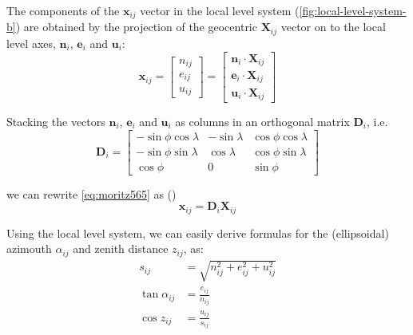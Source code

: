 The components of the $\bm{x}_{ij}$ vector in the local level system 
(\ref{fig:local-level-system-b})  are obtained by the projection of the geocentric 
$\bm{X}_{ij}$ vector on to the local level axes, $\bm{n}_i$, $\bm{e}_i$ and 
$\bm{u}_i$:
\begin{equation}
  \label{eq:moritz565}
  \bm{x}_{ij} = \begin{bmatrix} n_{ij} \\ e_{ij} \\ u_{ij} \end{bmatrix} = 
    \begin{bmatrix} 
      \bm{n}_i \cdot \bm{X}_{ij} \\
      \bm{e}_i \cdot \bm{X}_{ij} \\
      \bm{u}_i \cdot \bm{X}_{ij}
      \end{bmatrix}
\end{equation}

Stacking the vectors $\bm{n}_i$, $\bm{e}_i$ and $\bm{u}_i$ as columns in an 
orthogonal matrix $\bm{D}_i$, i.e.
\begin{equation}
  \bm{D}_i = \begin{bmatrix}
    -\sin \phi \cos \lambda & -\sin \lambda & \cos \phi \cos \lambda \\
    -\sin \phi \sin \lambda & \cos \lambda  & \cos \phi \sin \lambda \\
    \cos \phi & 0 & \sin \phi
  \end{bmatrix}
\end{equation}

we can rewrite \ref{eq:moritz565} as (\cite{moritz})
\begin{equation}
  \bm{x}_{ij} = \bm{D}_i \bm{X}_{ij}
\end{equation}

Using the local level system, we can easily derive formulas for the 
(ellipsoidal) azimouth $\alpha _{ij}$ and zenith distance $z_{ij}$, as:
\begin{equation}
  \begin{aligned}
    s_{ij} &= \sqrt{ n^2_{ij} + e^2_{ij} + u^2_{ij}} \\
    \tan{\alpha _{ij}} &= \frac{e_{ij}}{n_{ij}} \\
    \cos{z_{ij}} &= \frac{u_{ij}}{s_{ij}}
  \end{aligned}
\end{equation}
